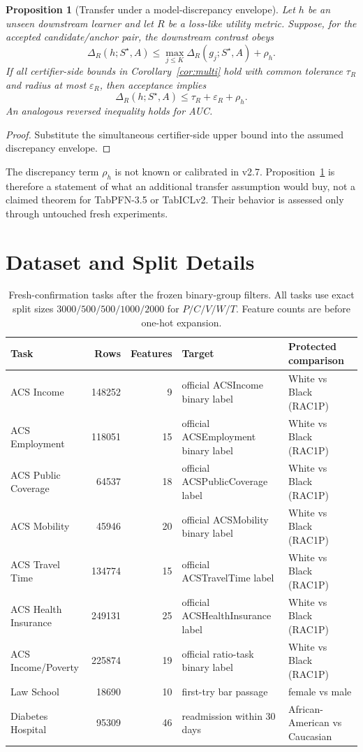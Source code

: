 \documentclass[10pt]{article}
\newtheorem{proposition}[theorem]{Proposition}
\begin{document}
\begin{proposition}[Transfer under a model-discrepancy envelope]
\label{prop:transfer}
Let $h$ be an unseen downstream learner and let $R$ be a loss-like utility metric. Suppose, for the accepted candidate/anchor pair, the downstream contrast obeys
\[
\Delta_R(h;S^\star,A)
\le
\max_{j\le K}\Delta_R(g_j;S^\star,A)+\rho_h.
\]
If all certifier-side bounds in Corollary~\ref{cor:multi} hold with common tolerance $\tau_R$ and radius at most $\varepsilon_R$, then acceptance implies
\[
\Delta_R(h;S^\star,A)
\le \tau_R+\varepsilon_R+\rho_h.
\]
An analogous reversed inequality holds for AUC.
\end{proposition}

\begin{proof}
Substitute the simultaneous certifier-side upper bound into the assumed discrepancy envelope.
\end{proof}

The discrepancy term $\rho_h$ is not known or calibrated in v2.7. Proposition~\ref{prop:transfer} is therefore a statement of what an additional transfer assumption would buy, not a claimed theorem for TabPFN-3.5 or TabICLv2. Their behavior is assessed only through untouched fresh experiments.


\section{Dataset and Split Details}

\begin{table}[h]
\centering
\caption{Fresh-confirmation tasks after the frozen binary-group filters. All tasks use exact split sizes $3000/500/500/1000/2000$ for $P/C/V/W/T$. Feature counts are before one-hot expansion.}
\label{tab:data}
\small
\begin{tabular}{lrrp{3.25cm}p{3.25cm}}
\toprule
Task & Rows & Features & Target & Protected comparison \\
\midrule
ACS Income & 148252 & 9 & official ACSIncome binary label & White vs Black (RAC1P) \\
ACS Employment & 118051 & 15 & official ACSEmployment binary label & White vs Black (RAC1P) \\
ACS Public Coverage & 64537 & 18 & official ACSPublicCoverage label & White vs Black (RAC1P) \\
ACS Mobility & 45946 & 20 & official ACSMobility binary label & White vs Black (RAC1P) \\
ACS Travel Time & 134774 & 15 & official ACSTravelTime label & White vs Black (RAC1P) \\
ACS Health Insurance & 249131 & 25 & official ACSHealthInsurance label & White vs Black (RAC1P) \\
ACS Income/Poverty & 225874 & 19 & official ratio-task binary label & White vs Black (RAC1P) \\
Law School & 18690 & 10 & first-try bar passage & female vs male \\
Diabetes Hospital & 95309 & 46 & readmission within 30 days & African-American vs Caucasian \\
\bottomrule
\end{tabular}
\end{table}
\end{document}
